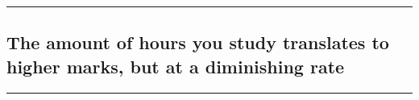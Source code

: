 \documentclass[
]{article}
\newenvironment{Shaded}{\begin{snugshade}}{\end{snugshade}}
\newcommand{\DataTypeTok}[1]{\textcolor[rgb]{0.13,0.29,0.53}{#1}}
\newcommand{\DecValTok}[1]{\textcolor[rgb]{0.00,0.00,0.81}{#1}}
\newcommand{\FloatTok}[1]{\textcolor[rgb]{0.00,0.00,0.81}{#1}}
\newcommand{\KeywordTok}[1]{\textcolor[rgb]{0.13,0.29,0.53}{\textbf{#1}}}
\newcommand{\NormalTok}[1]{#1}
\newcommand{\OperatorTok}[1]{\textcolor[rgb]{0.81,0.36,0.00}{\textbf{#1}}}
\newcommand{\StringTok}[1]{\textcolor[rgb]{0.31,0.60,0.02}{#1}}
\begin{document}
\begin{center}\rule{0.5\linewidth}{0.5pt}\end{center}

\hypertarget{the-amount-of-hours-you-study-translates-to-higher-marks-but-at-a-diminishing-rate}{%
\subsection{The amount of hours you study translates to higher marks,
but at a diminishing
rate}\label{the-amount-of-hours-you-study-translates-to-higher-marks-but-at-a-diminishing-rate}}

\begin{center}\rule{0.5\linewidth}{0.5pt}\end{center}

\begin{Shaded}
\end{Shaded}
\end{document}
